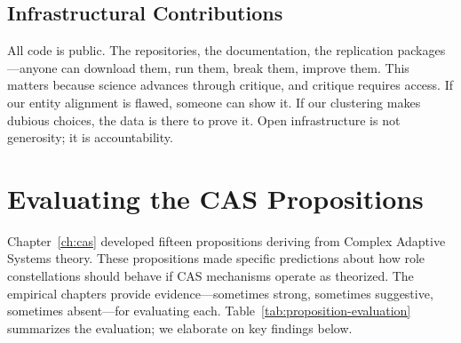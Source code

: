 \documentclass[../main.tex]{subfiles}
\begin{document}
\subsection{Infrastructural Contributions}

All code is public. The repositories, the documentation, the replication packages---anyone can download them, run them, break them, improve them. This matters because science advances through critique, and critique requires access. If our entity alignment is flawed, someone can show it. If our clustering makes dubious choices, the data is there to prove it. Open infrastructure is not generosity; it is accountability.


\section{Evaluating the CAS Propositions}

Chapter~\ref{ch:cas} developed fifteen propositions deriving from Complex Adaptive Systems theory. These propositions made specific predictions about how role constellations should behave if CAS mechanisms operate as theorized. The empirical chapters provide evidence---sometimes strong, sometimes suggestive, sometimes absent---for evaluating each. Table~\ref{tab:proposition-evaluation} summarizes the evaluation; we elaborate on key findings below.
\end{document}
